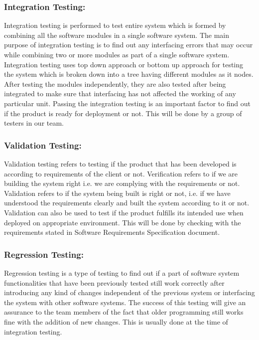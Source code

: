 \documentclass[12pt]{article}
\begin{document}
\subsubsection{Integration Testing:}
Integration testing is performed to test entire system which is formed by combining all the software modules in a single software system. The main purpose of integration testing is to find out any interfacing errors that may occur while combining two or more modules as part of a single software system. Integration testing uses top down approach or bottom up approach for testing the system which is broken down into a tree having different modules as it nodes. After testing the modules independently, they are also tested after being integrated to make sure that interfacing has not affected the working of any particular unit. Passing the integration testing is an important factor to find out if the product is ready for deployment or not. This will be done by a group of testers in our team.
 \subsubsection{Validation Testing:}
Validation testing refers to testing if the product that has been developed is according to requirements of the client or not. Verification refers to if we are building the system right i.e. we are complying with the requirements or not. Validation refers to if the system being built is right or not, i.e. if we have understood the requirements clearly and built the system according to it or not. Validation can also be used to test if the product fulfills its intended use when deployed on appropriate environment. This will be done by checking with the requirements stated in Software Requirements Specification document.

\subsubsection{Regression Testing:}
Regression testing is a type of testing to find out if a part of software system functionalities that have been previously tested still work correctly after introducing any kind of changes independent of the previous system or interfacing the system with other software systems. The success of this testing will give an assurance to the team members of the fact that older programming still works fine with the addition of new changes. This is usually done at the time of integration testing.
\end{document}
